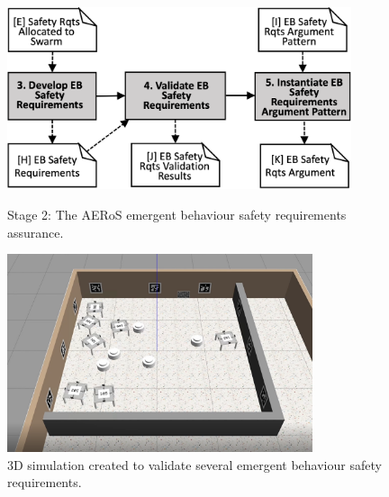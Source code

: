 \documentclass[runningheads]{llncs}
\begin{document}

\begin{figure}[!t]
	\centering
	\begin{minipage}{.57\textwidth}
		\centering
		\includegraphics[width=0.9\textwidth]{figures/AERoS-Stage2.png}%
		\vspace{-2ex}
		\caption{Stage 2: The AERoS emergent behaviour safety requirements assurance.}%
	\label{amlas-a-stage2}
\end{minipage}%
\begin{minipage}{.43\textwidth}
	\centering
	\includegraphics[trim={30mm 25mm 45mm 30mm},clip,width=0.8\textwidth]{figures/3Dsim.png}
	\vspace{-2ex}
	\caption{3D simulation created to validate several emergent behaviour safety requirements.}
	\label{3Dsim}
\end{minipage}
\vspace{-4ex}
\end{figure}
\end{document}
